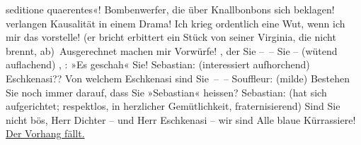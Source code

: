 \begin{ledgroupsized}[t]{13cm}
{               seditione quaerentes}{}\label{K_L01900-3h}«! Bombenwerfer, die über Knallbonbons sich beklagen!  verlangen Kausalität in einem Drama! Ich krieg
               ordentlich eine Wut, wenn ich mir das vorstelle! (er bricht erbittert ein Stück von
               seiner Virginia, die nicht brennt, ab) Ausgerechnet 
               machen mir Vorwürfe! {\pb}, der Sie – – Sie – (wütend auflachend) , : »Es geschah« Sie!\pend
           \pstart
           Sebastian: (interessiert aufhorchend) Eschkenasi?? Von welchem Eschkenasi sind
               Sie – –\pend
           \pstart
           Souffleur: (milde) Bestehen Sie noch immer darauf, dass Sie  »Sebastian« heissen?\pend
           \pstart
           Sebastian: (hat sich aufgerichtet; respektlos, in herzlicher Gemütlichkeit,
               fraternisierend) Sind Sie nicht bös, Herr Dichter – und Herr Eschkenasi – wir sind
               Alle blaue Kürrassiere!\pend
           \pstart
           \centering{}\uline{Der Vorhang fällt.}\pend
           
         
         \endnumbering{}\end{ledgroupsized}  \newcommand{\dateiname}{L01900}\newcommand{\titel}{Richard Beer-Hofmann an Arthur Schnitzler, [13. 12. 1909?]}\newcommand{\editorInnen}{Martin Anton Müller und Gerd-Hermann Susen}
      